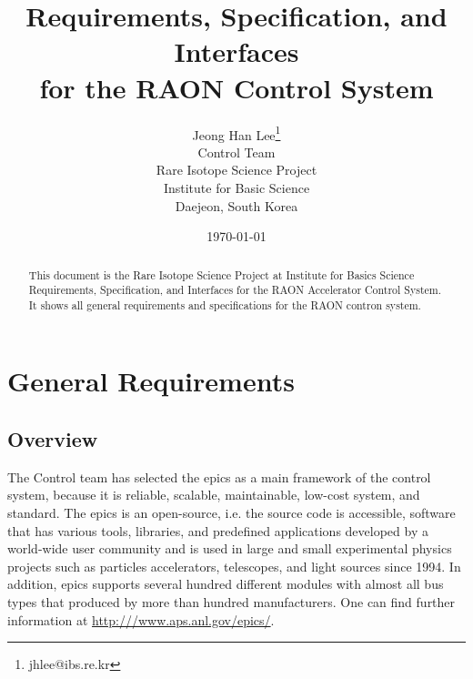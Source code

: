 \documentclass[11pt
  , a4paper
  , article
  , oneside
]{memoir}
\begin{document}
\newcommand{\technumber}{
  RAON Control-Document Series\\
  Revision : v0.1,   Release : Nov, 19, 2014}
\title{\textbf{Requirements, Specification, and Interfaces \\ for the RAON Control System}}

\author{Jeong Han Lee\thanks{jhlee@ibs.re.kr} \\
  Control Team \\
  Rare Isotope Science Project\\
  Institute for Basic Science\\
  Daejeon, South Korea
}
\date{\today}

\renewcommand{\maketitlehooka}{\begin{flushright}\textsf{\technumber}\end{flushright}}

\maketitle

\begin{abstract}
This document is the Rare Isotope Science Project at Institute for Basics Science Requirements, Specification, and Interfaces for the RAON Accelerator Control System. It shows all general requirements and specifications for the RAON contron system. 
\end{abstract}

 


\chapter{General Requirements}
\section{Overview}
\label{overview}
The Control team has selected the \Gls{epics} \cite{EPICS3.14.12.3} as a main framework of the control system, because it is reliable, scalable, maintainable, low-cost system, and standard. The \Gls{epics} is an open-source, i.e. the source code is accessible, software that has various tools, libraries, and predefined applications developed by a world-wide user community and is used in large and small experimental physics projects such as particles accelerators, telescopes, and light sources since 1994. In addition, \Gls{epics} supports several hundred different modules with almost all bus types that produced by more than hundred manufacturers. One can find further information at \url{http:///www.aps.anl.gov/epics/}.
\end{document}
